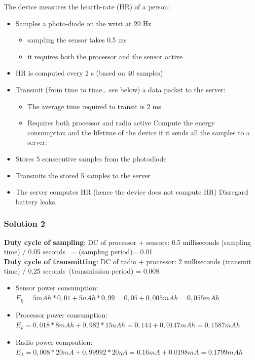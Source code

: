 \documentclass[10pt,a4paper]{report}
\theoremstyle{definition}
\begin{document}
The device measures the hearth-rate (HR) of a person:
\begin{itemize}
	\item 
	Samples a photo-diode on the wrist at 20 Hz
	\begin{itemize}
		\item 
		sampling the sensor takes 0.5 ms
		\item 
		it requires both the processor and the sensor active
	\end{itemize}
	\item 
	HR is computed every 2 s (based on 40 samples)
	\item 
	Transmit (from time to time… see below) a data packet to the server:
	\begin{itemize}
		\item 
		The average time required to transit is 2 ms
		\item 
		Requires both processor and radio active
		Compute the energy consumption and the lifetime of the device if it sends all the samples to a server:
	\end{itemize}
	\item 
	Stores 5 consecutive samples from the photodiode
	\item 
	Transmits the stored 5 samples to the server
	\item 
	The server computes HR (hence the device does not compute HR)
	Disregard battery leaks.
\end{itemize}
\subsubsection{Solution 2}\label{sec:solution-2}
\textbf{Duty cycle of sampling}: DC of processor + sensors: 0.5 milliseconds (sampling time) / 0.05 seconds  = (sampling period)= 0.01\\

\textbf{Duty cycle of transmitting}: DC of radio + processor: 2 milliseconds (transmit time) / 0,25 seconds (transmission period) = 0.008
\begin{itemize}
	\item Sensor power consumption:
	$E_{\eta} = 5 mAh * 0,01+ 5 uAh *0,99 =0,05+0,005 mAh = 0,055 mAh$
	\item Processor power consumption:
	$E_{\rho}=0,018*8 mAh + 0,982*15 uAh =0,144+0,0147 mAh = 0,1587 mAh$
	\item Radio power compsution:
	$E_{\lambda}=0,008*20 mA + 0,99992*20\eta A = 0.16 mA + 0.0198 mA = 0.1799 mAh$
\end{itemize}
\end{document}
